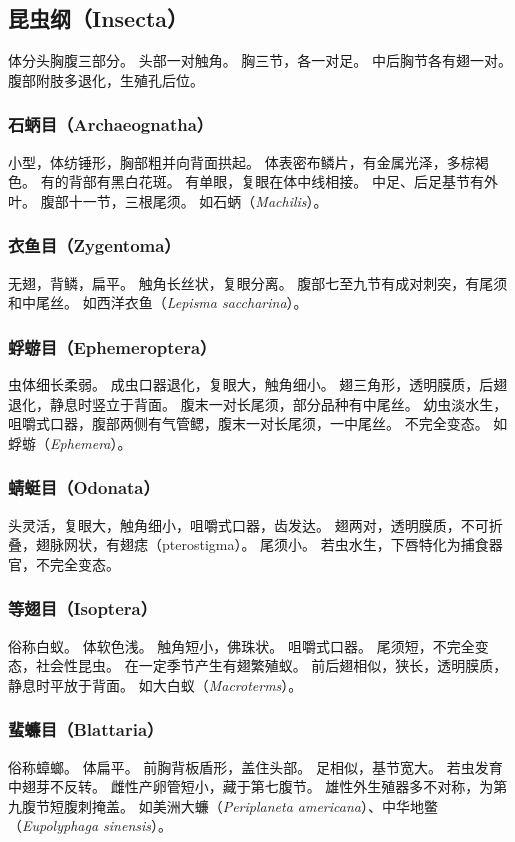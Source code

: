 \documentclass[11pt]{article}
\begin{document}
\subsection{昆虫纲（Insecta）}
体分头胸腹三部分。
头部一对触角。
胸三节，各一对足。
中后胸节各有翅一对。
腹部附肢多退化，生殖孔后位。

\subsubsection{石蛃目（Archaeognatha）}
小型，体纺锤形，胸部粗并向背面拱起。
体表密布鳞片，有金属光泽，多棕褐色。
有的背部有黑白花斑。
有单眼，复眼在体中线相接。
中足、后足基节有外叶。
腹部十一节，三根尾须。
如石蛃（\textit{Machilis}）。

\subsubsection{衣鱼目（Zygentoma）}
无翅，背鳞，扁平。
触角长丝状，复眼分离。
腹部七至九节有成对刺突，有尾须和中尾丝。
如西洋衣鱼（\textit{Lepisma saccharina}）。

\subsubsection{蜉蝣目（Ephemeroptera）}
虫体细长柔弱。
成虫口器退化，复眼大，触角细小。
翅三角形，透明膜质，后翅退化，静息时竖立于背面。
腹末一对长尾须，部分品种有中尾丝。
幼虫淡水生，咀嚼式口器，腹部两侧有气管鳃，腹末一对长尾须，一中尾丝。
不完全变态。
如蜉蝣（\textit{Ephemera}）。

\subsubsection{蜻蜓目（Odonata）}
头灵活，复眼大，触角细小，咀嚼式口器，齿发达。
翅两对，透明膜质，不可折叠，翅脉网状，有翅痣（pterostigma）。
尾须小。
若虫水生，下唇特化为捕食器官，不完全变态。

\subsubsection{等翅目（Isoptera）}
俗称白蚁。
体软色浅。
触角短小，佛珠状。
咀嚼式口器。
尾须短，不完全变态，社会性昆虫。
在一定季节产生有翅繁殖蚁。
前后翅相似，狭长，透明膜质，静息时平放于背面。
如大白蚁（\textit{Macroterms}）。

\subsubsection{蜚蠊目（Blattaria）}
俗称蟑螂。
体扁平。
前胸背板盾形，盖住头部。
足相似，基节宽大。
若虫发育中翅芽不反转。
雌性产卵管短小，藏于第七腹节。
雄性外生殖器多不对称，为第九腹节短腹刺掩盖。
如美洲大蠊（\textit{Periplaneta americana}）、中华地鳖（\textit{Eupolyphaga sinensis}）。
\end{document}
